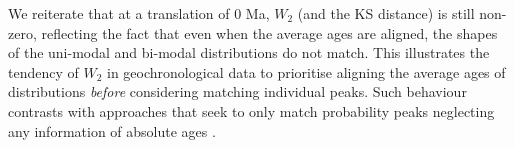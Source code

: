 \documentclass[gchron, manuscript]{article}
\begin{document}
We reiterate that at a translation of 0 Ma, $W_2$ (and the KS distance) is still non-zero, reflecting the fact that even when the average ages are aligned, the shapes of the uni-modal and bi-modal distributions do not match. This illustrates the tendency of $W_2$ in geochronological data to prioritise aligning the average ages of distributions \textit{before} considering matching individual peaks. Such behaviour contrasts with approaches that seek to only match probability peaks neglecting any information of absolute ages \citealt[e.g.,][]{saylor_quantifying_2016}.


\end{document}
